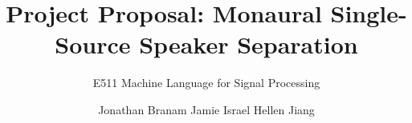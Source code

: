 \documentclass{e511-project}
\begin{document}
%

\title{Project Proposal: Monaural Single-Source Speaker Separation}
\subtitle{E511 Machine Language for Signal Processing}
%
%
%
%
%

%
\author{
%
%
\alignauthor
Jonathan Branam
\alignauthor
Jamie Israel
\alignauthor
Hellen Jiang
}
\end{document}
